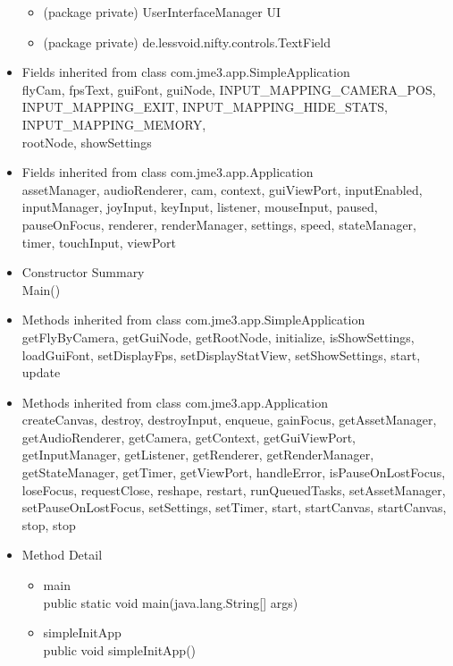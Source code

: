 \documentclass[letterpaper]{article}
\begin{document}
\begin{itemize}
\begin{itemize}
										\item	(package private) UserInterfaceManager	UI 
										\item	(package private) de.lessvoid.nifty.controls.TextField
									\end{itemize} 
							\item	Fields inherited from class com.jme3.app.SimpleApplication \\
									flyCam, fpsText, guiFont, guiNode, INPUT\_MAPPING\_CAMERA\_POS, \\ INPUT\_MAPPING\_EXIT, INPUT\_MAPPING\_HIDE\_STATS, INPUT\_MAPPING\_MEMORY, \\ rootNode, showSettings
							\item	Fields inherited from class com.jme3.app.Application \\
									assetManager, audioRenderer, cam, context, guiViewPort, inputEnabled, inputManager, joyInput, keyInput, listener, mouseInput, paused, pauseOnFocus, renderer, renderManager, settings, speed, stateManager, timer, touchInput, viewPort
							\item	Constructor Summary \\
									Main()
							\item	Methods inherited from class com.jme3.app.SimpleApplication \\
									getFlyByCamera, getGuiNode, getRootNode, initialize, isShowSettings, loadGuiFont, setDisplayFps, setDisplayStatView, setShowSettings, start, update
							\item	Methods inherited from class com.jme3.app.Application \\
									createCanvas, destroy, destroyInput, enqueue, gainFocus, getAssetManager, getAudioRenderer, getCamera, getContext, getGuiViewPort, getInputManager, getListener, getRenderer, getRenderManager, getStateManager, getTimer, getViewPort, handleError, isPauseOnLostFocus, loseFocus, requestClose, reshape, restart, runQueuedTasks, setAssetManager, setPauseOnLostFocus, setSettings, setTimer, start, startCanvas, startCanvas, stop, stop
							\item	Method Detail
									\begin{itemize}
										\item	main \\
												public static void main(java.lang.String[] args)
										\item	simpleInitApp \\
												public void simpleInitApp() \\ \\

\end{itemize}
\end{itemize}
\end{document}
